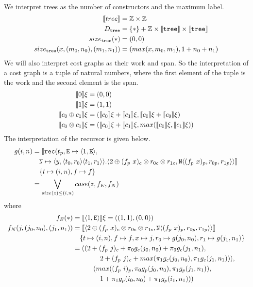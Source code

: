 \paragraph{}
We interpret trees as the number of  constructors and the maximum label.
%
\begin{align*}
  \llbracket tree \rrbracket &= \mathbb{Z} \times \mathbb{Z} \\
  D_{\texttt{tree}} &= \{\ast\} + \mathbb{Z} \times \llbracket \texttt{tree} \rrbracket \times \llbracket \texttt{tree} \rrbracket \\
  size_{\texttt{tree}}(\ast) &= (0, 0) \\
  size_{\texttt{tree}}(x, (m_0, n_0), (m_1, n_1)) &= (max(x, m_0, m_1), 1 + n_0 + n_1)
\end{align*}
%
We will also interpret cost graphs as their work and span. So the
interpretation of a cost graph is a tuple of natural numbers, where the first
element of the tuple is the work and the second element is the span.
%
\begin{align*}
  \llbracket 0 \rrbracket\xi &= (0,0) \\
  \llbracket 1 \rrbracket\xi &= (1,1) \\
  \llbracket c_0 \oplus c_1 \rrbracket\xi &= (\llbracket c_0 \rrbracket\xi + \llbracket c_1 \rrbracket\xi, \llbracket c_0 \rrbracket\xi + \llbracket c_0 \rrbracket \xi)\\
  \llbracket c_0 \otimes c_1 \rrbracket\xi &= (\llbracket c_0 \rrbracket\xi + \llbracket c_1 \rrbracket\xi, max(\llbracket c_0 \rrbracket\xi, \llbracket c_1 \rrbracket\xi))
\end{align*}
%
The interpretation of the recursor is given below.
%
\begin{align*}
  g(i,n) &= \llbracket \texttt{rec}(t_p, \texttt{E} \mapsto \langle 1, \texttt{E}\rangle, \\
         &\quad \texttt{N} \mapsto \langle y, \langle t_0, r_0 \rangle \langle t_1, r_1 \rangle \rangle.  \langle 2 \oplus (f_p\ x)_c \otimes r_{0c} \otimes r_{1c}, \texttt{N} \langle (f_p\ x)_p, r_{0p}, r_{1p}\rangle\rangle \rrbracket\\
         &\quad \{t \mapsto (i,n), f \mapsto f \} \\
         &= \bigvee\limits_{size(z) \leq (i,n)} case(z, f_E, f_N)
\end{align*}
where
\begin{align*}
  f_E(\ast) &= \llbracket \langle 1, \texttt{E} \rangle\rrbracket\xi = ((1, 1), (0, 0)) \\
  f_N(j, (j_0,n_0), (j_1, n_1)) &= \llbracket \langle 2 \oplus (f_p\ x)_c \otimes r_{0c} \otimes r_{1c}, \texttt{N} \langle (f_p\ x)_p, r_{0p}, r_{1p}\rangle\rangle \rrbracket\\
                                &\quad \{t \mapsto (i,n), f \mapsto f, x \mapsto j, r_0 \mapsto g(j_0,n_0), r_1 \mapsto g(j_1,n_1) \} \\
                                &= ((2 + (f_p\ j)_c + \pi_0g_c(j_0,n_0) +\pi_0 g_c(j_1,n_1), \\
                                &\qquad\quad\quad 2 + (f_p\ j)_c + max(\pi_1 g_c(j_0,n_0), \pi_1 g_c(j_1,n_1))),\\
                                &\qquad\quad (max((f_p\ i)_p, \pi_0 g_p(j_0,n_0), \pi_1 g_p(j_1,n_1)), \\
                                &\qquad\quad\quad 1 + \pi_1 g_p(i_0,n_0) + \pi_1 g_p(i_1,n_1)))
\end{align*}
